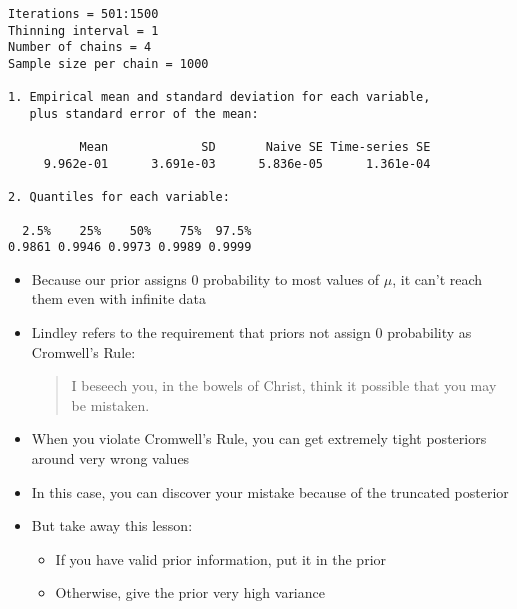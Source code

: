 \documentclass{beamer}
\begin{document}
\begin{frame}[fragile]
  \begin{verbatim}
Iterations = 501:1500
Thinning interval = 1 
Number of chains = 4 
Sample size per chain = 1000 

1. Empirical mean and standard deviation for each variable,
   plus standard error of the mean:

          Mean             SD       Naive SE Time-series SE 
     9.962e-01      3.691e-03      5.836e-05      1.361e-04 

2. Quantiles for each variable:

  2.5%    25%    50%    75%  97.5% 
0.9861 0.9946 0.9973 0.9989 0.9999 
  \end{verbatim}
\end{frame}

\begin{frame}[fragile]
  \begin{itemize}
    \item{Because our prior assigns 0 probability to most values of $\mu$, it can't reach them even with infinite data}
    \item{Lindley refers to the requirement that priors not assign 0 probability as Cromwell's Rule:}
  \begin{quote}
I beseech you, in the bowels of Christ, think it possible that you may be mistaken.
  \end{quote}
  \item{When you violate Cromwell's Rule, you can get extremely tight posteriors around very wrong values}
  \item{In this case, you can discover your mistake because of the truncated posterior}
  \end{itemize}
\end{frame}

\begin{frame}[fragile]
  \begin{itemize}
    \item{But take away this lesson:}
    \begin{itemize}
      \item{If you have valid prior information, put it in the prior}
      \item{Otherwise, give the prior very high variance}
    \end{itemize}
  \end{itemize}
\end{frame}

\end{document}
